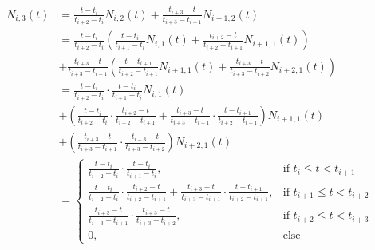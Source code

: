 \begin{align*}
N_{i,3}(t) &= \frac{t-t_i}{t_{i+2}-t_i}N_{i,2}(t)+\frac{t_{i+3}-t}{t_{i+3}-t_{i+1}}N_{i+1,2}(t)\\
&= \frac{t-t_i}{t_{i+2}-t_i}\left(\frac{t-t_i}{t_{i+1}-t_i}N_{i,1}(t)+\frac{t_{i+2}-t}{t_{i+2}-t_{i+1}}N_{i+1,1}(t)\right)\\
&+ \frac{t_{i+3}-t}{t_{i+3}-t_{i+1}}\left(\frac{t-t_{i+1}}{t_{i+2}-t_{i+1}}N_{i+1,1}(t)+\frac{t_{i+3}-t}{t_{i+3}-t_{i+2}}N_{i+2,1}(t)\right)\\
&= \frac{t-t_i}{t_{i+2}-t_i}\cdot \frac{t-t_i}{t_{i+1}-t_i}N_{i,1}(t)\\
&+ \left(\frac{t-t_i}{t_{i+2}-t_i}\cdot \frac{t_{i+2}-t}{t_{i+2}-t_{i+1}}+\frac{t_{i+3}-t}{t_{i+3}-t_{i+1}}\cdot \frac{t-t_{i+1}}{t_{i+2}-t_{i+1}} \right) N_{i+1,1}(t)\\
&+ \left(\frac{t_{i+3}-t}{t_{i+3}-t_{i+1}} \cdot \frac{t_{i+3}-t}{t_{i+3}-t_{i+2}} \right) N_{i+2,1}(t)\\
&=
\begin{cases}
\frac{t-t_i}{t_{i+2}-t_i}\cdot \frac{t-t_i}{t_{i+1}-t_i}, & \text{if } t_i \le t < t_{i+1} \\
\frac{t-t_i}{t_{i+2}-t_i}\cdot \frac{t_{i+2}-t}{t_{i+2}-t_{i+1}}+\frac{t_{i+3}-t}{t_{i+3}-t_{i+1}}\cdot \frac{t-t_{i+1}}{t_{i+2}-t_{i+1}}, & \text{if } t_{i+1} \le t < t_{i+2}\\
\frac{t_{i+3}-t}{t_{i+3}-t_{i+1}} \cdot \frac{t_{i+3}-t}{t_{i+3}-t_{i+2}}, & \text{if } t_{i+2} \le t < t_{i+3} \\
0, & \text{else} 
\end{cases}
\end{align*}









